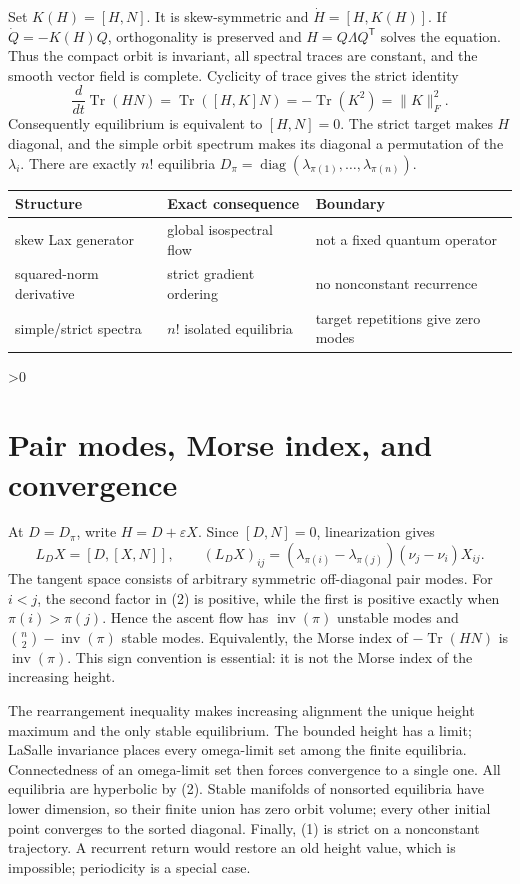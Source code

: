\documentclass[9pt]{extarticle}
\begin{document}
Set $K(H)=[H,N]$.  It is skew-symmetric and
$\dot H=[H,K(H)]$.  If $\dot Q=-K(H)Q$, orthogonality is preserved and
$H=Q\Lambda Q^{\mathsf T}$ solves the equation.  Thus the compact orbit is
invariant, all spectral traces are constant, and the smooth vector field is
complete.  Cyclicity of trace gives the strict identity
\[
 \frac{d}{dt}\operatorname{Tr}(HN)
 =\operatorname{Tr}([H,K]N)
 =-\operatorname{Tr}(K^2)
 =\lVert K\rVert_F^2.                                      \tag{1}
\]
Consequently equilibrium is equivalent to $[H,N]=0$.  The strict target makes
$H$ diagonal, and the simple orbit spectrum makes its diagonal a permutation
of the $\lambda_i$.  There are exactly $n!$ equilibria
$D_\pi=\operatorname{diag}(\lambda_{\pi(1)},\ldots,
\lambda_{\pi(n)})$.

\begin{center}\small
\begin{tabular}{lll}
\toprule
Structure & Exact consequence & Boundary\tabularnewline
\midrule
skew Lax generator & global isospectral flow & not a fixed quantum operator\tabularnewline
squared-norm derivative & strict gradient ordering & no nonconstant recurrence\tabularnewline
simple/strict spectra & $n!$ isolated equilibria & target repetitions give zero modes\tabularnewline
\bottomrule
\end{tabular}
\end{center}

\ifnum\CRevisionRound>0
\section{Pair modes, Morse index, and convergence}
At $D=D_\pi$, write $H=D+\varepsilon X$.  Since $[D,N]=0$, linearization gives
\[
 L_DX=[D,[X,N]],\qquad
 (L_DX)_{ij}=(\lambda_{\pi(i)}-\lambda_{\pi(j)})
 (\nu_j-\nu_i)X_{ij}.                                    \tag{2}
\]
The tangent space consists of arbitrary symmetric off-diagonal pair modes.
For $i<j$, the second factor in (2) is positive, while the first is positive
exactly when $\pi(i)>\pi(j)$.  Hence the ascent flow has
$\operatorname{inv}(\pi)$ unstable modes and
$\binom n2-\operatorname{inv}(\pi)$ stable modes.  Equivalently, the Morse
index of $-\operatorname{Tr}(HN)$ is $\operatorname{inv}(\pi)$.  This sign
convention is essential: it is not the Morse index of the increasing height.

The rearrangement inequality makes increasing alignment the unique height
maximum and the only stable equilibrium.  The bounded height has a limit;
LaSalle invariance places every omega-limit set among the finite equilibria.
Connectedness of an omega-limit set then forces convergence to a single one.
All equilibria are hyperbolic by (2).  Stable manifolds of nonsorted
equilibria have lower dimension, so their finite union has zero orbit volume;
every other initial point converges to the sorted diagonal.  Finally, (1) is
strict on a nonconstant trajectory.  A recurrent return would restore an old
height value, which is impossible; periodicity is a special case.
\fi
\end{document}
